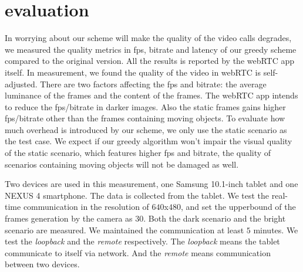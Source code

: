 \section{evaluation}
\label{sec:evaluation}

In worrying about our scheme will make the quality of the video calls
degrades, we measured the quality metrics in fps, bitrate and latency
of our greedy scheme compared to the original version. All the results
is reported by the webRTC app itself. In measurement, we found the
quality of the video in webRTC is self-adjusted. There are two factors
affecting the fps and bitrate: the average luminance of the frames and
the content of the frames. The webRTC app intends to reduce the
fps/bitrate in darker images. Also the static frames gains higher
fps/bitrate other than the frames containing moving objects. To
evaluate how much overhead is introduced by our scheme, we only use
the static scenario as the test case. We expect if our greedy
algorithm won't impair the visual quality of the static scenario,
which features higher fps and bitrate, the quality of scenarios
containing moving objects will not be damaged as well.


Two devices are used in this measurement, one Samsung 10.1-inch tablet
and one NEXUS 4 smartphone. The data is collected from the tablet. We test the
real-time communication in the resolution of $640$x$480$, and set the
upperbound of the frames generation by the camera as $30$. Both the
dark scenario and the bright scenario are measured. We maintained the
communication at least $5$ minutes. We test the {\it loopback} and the
{\it remote} respectively. The {\it loopback} means the tablet
communicate to itself via network. And the {\it remote} means
communication between two devices.

